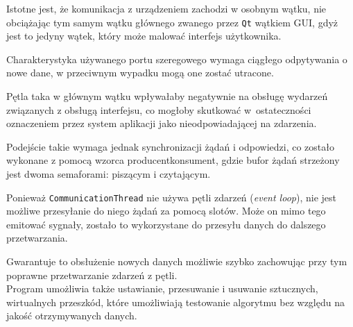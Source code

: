 Istotne jest, że komunikacja z urządzeniem zachodzi w osobnym wątku, nie obciążając tym samym wątku głównego zwanego przez \texttt{Qt} wątkiem GUI, gdyż jest to jedyny wątek, który może malować interfejs użytkownika.

Charakterystyka używanego portu szeregowego wymaga ciągłego odpytywania o nowe dane, w przeciwnym wypadku mogą one zostać utracone.

Pętla taka w głównym wątku wpływałaby negatywnie na obsługę wydarzeń związanych z obsługą interfejsu, co mogłoby skutkować w~ostateczności oznaczeniem przez system aplikacji jako nieodpowiadającej na zdarzenia.

Podejście takie wymaga jednak synchronizacji żądań i odpowiedzi, co zostało wykonane z pomocą wzorca producent\pauza{}konsument, gdzie bufor żądań strzeżony jest dwoma semaforami: piszącym i czytającym.

Ponieważ \verb|CommunicationThread| nie używa pętli zdarzeń (\textsl{event loop}), nie jest możliwe przesyłanie do niego żądań za pomocą slotów. Może on mimo tego emitować sygnały, zostało to wykorzystane do przesyłu danych do dalszego przetwarzania.

Gwarantuje to obsłużenie nowych danych możliwie szybko zachowując przy tym poprawne przetwarzanie zdarzeń z pętli.\\

Program umożliwia także ustawianie, przesuwanie i usuwanie sztucznych, wirtualnych przeszkód, które umożliwiają testowanie algorytmu bez względu na jakość otrzymywanych danych.

